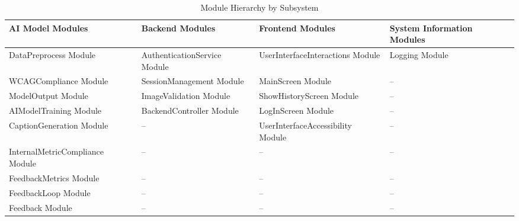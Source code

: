 \documentclass[12pt, titlepage]{article}
\begin{document}
\begin{table}[H]
  \caption{Module Hierarchy by Subsystem}
  \label{TblMHS}
  \centering
  \small
  \begin{tabularx}{\textwidth}{YYYY}
    \toprule
    \textbf{AI Model Modules} & \textbf{Backend Modules} &
    \textbf{Frontend Modules} & \textbf{System Information Modules}\\
    \midrule
    DataPreprocess Module & AuthenticationService Module & UserInterfaceInteractions Module & Logging Module\\
    WCAGCompliance Module & SessionManagement Module & MainScreen Module & --\\
    ModelOutput Module & ImageValidation Module & ShowHistoryScreen Module & --\\
    AIModelTraining Module & BackendController Module & LogInScreen Module & --\\
    CaptionGeneration Module & -- & UserInterfaceAccessibility Module & --\\
    InternalMetricCompliance Module & -- & -- & --\\
    FeedbackMetrics Module & -- & -- & --\\
    FeedbackLoop Module & -- & -- & --\\
    Feedback Module & -- & -- & --\\
    \bottomrule
  \end{tabularx}
\end{table}
\end{document}
